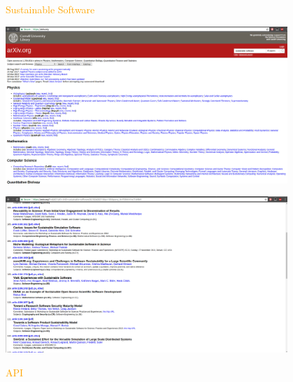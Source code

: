 \documentclass{beamer}
\begin{document}
\begin{frame}
    \centering
    
\end{frame}

\begin{frame}
\begin{center}
\textcolor{orange}{
    \Huge{Sustainable Software}}
\end{center}
\end{frame}

\begin{frame}
\begin{center}
    \includegraphics[width=0.8\textwidth]{static/arxiv_search.png}
\end{center}
\end{frame}

\begin{frame}
\begin{center}
    \includegraphics[width=0.8\textwidth]{static/arxiv_results.png}
\end{center}
\end{frame}

\begin{frame}
\begin{center}
\textcolor{orange}{
\Huge{API}}
\end{center}
\end{frame}
\end{document}
